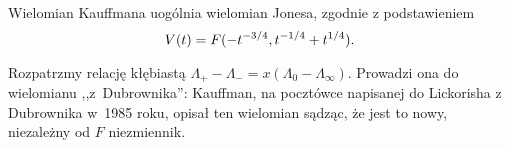 \begin{proposition}
    Wielomian Kauffmana uogólnia wielomian Jonesa, zgodnie z podstawieniem
    \begin{equation}
        V(t)=F(-t^{-3/4},t^{-1/4}+t^{1/4}).
    \end{equation}
\end{proposition}

Rozpatrzmy relację kłębiastą $\Lambda_+ - \Lambda_- = x(\Lambda_0 - \Lambda_\infty)$.
Prowadzi ona do wielomianu ,,z~Dubrownika'': Kauffman, na pocztówce napisanej do Lickorisha z Dubrownika w~1985 roku, opisał ten wielomian sądząc, że jest to nowy, niezależny od $F$ niezmiennik.


